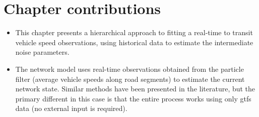 \section{Chapter contributions}
\label{sec:nw_contrib}

\begin{itemize}
\item This chapter presents a hierarchical approach to fitting a real-time \kf{} to transit vehicle speed observations, using historical data to estimate the intermediate noise parameters.
\item The network model uses real-time observations obtained from the particle filter (average vehicle speeds along road segments) to estimate the current network state. Similar methods have been presented in the literature, but the primary different in this case is that the entire process works using only \gls{gtfs} data (no external input is required).
\end{itemize}
